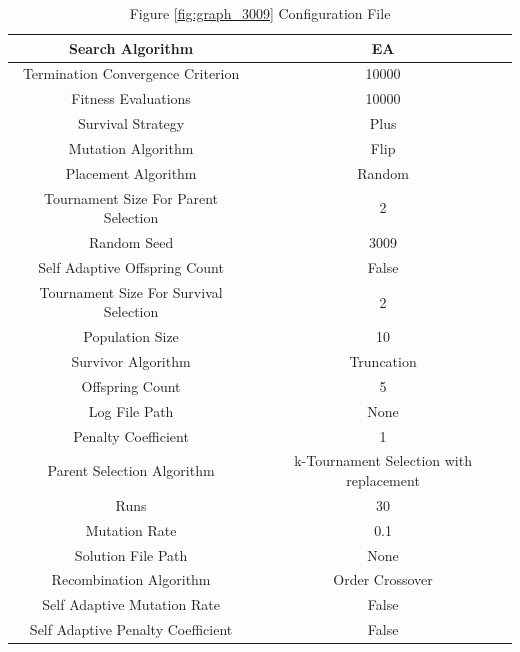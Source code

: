 \documentclass{standalone}
\begin{document}
\begin{table}[!htb]
	\centering
	\caption{Figure \ref{fig:graph_3009} Configuration File}
	\label{tab:graph_3009}
	\begin{tabular}{| c | c |}
		\hline
		Search Algorithm		& EA		 \\
		\hline
		Termination Convergence Criterion		& 10000		 \\
		\hline
		Fitness Evaluations		& 10000		 \\
		\hline
		Survival Strategy		& Plus		 \\
		\hline
		Mutation Algorithm		& Flip		 \\
		\hline
		Placement Algorithm		& Random		 \\
		\hline
		Tournament Size For Parent Selection		& 2		 \\
		\hline
		Random Seed		& 3009		 \\
		\hline
		Self Adaptive Offspring Count		& False		 \\
		\hline
		Tournament Size For Survival Selection		& 2		 \\
		\hline
		Population Size		& 10		 \\
		\hline
		Survivor Algorithm		& Truncation		 \\
		\hline
		Offspring Count		& 5		 \\
		\hline
		Log File Path		& None		 \\
		\hline
		Penalty Coefficient		& 1		 \\
		\hline
		Parent Selection Algorithm		& k-Tournament Selection with replacement		 \\
		\hline
		Runs		& 30		 \\
		\hline
		Mutation Rate		& 0.1		 \\
		\hline
		Solution File Path		& None		 \\
		\hline
		Recombination Algorithm		& Order Crossover		 \\
		\hline
		Self Adaptive Mutation Rate		& False		 \\
		\hline
		Self Adaptive Penalty Coefficient		& False		 \\
		\hline
	\end{tabular}
\end{table}
\end{document}
